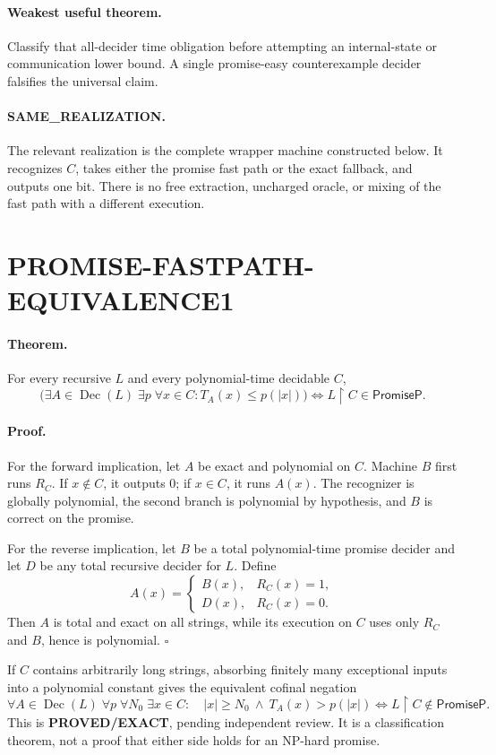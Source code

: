 \documentclass[11pt]{article}
\newcommand{\PromiseP}{\mathsf{PromiseP}}
\newcommand{\EXACT}{\textbf{PROVED/EXACT}}
\begin{document}
\paragraph{Weakest useful theorem.}
Classify that all-decider time obligation before attempting an internal-state
or communication lower bound.  A single promise-easy counterexample decider
falsifies the universal claim.

\paragraph{SAME\_REALIZATION.}
The relevant realization is the complete wrapper machine constructed below.
It recognizes $C$, takes either the promise fast path or the exact fallback,
and outputs one bit.  There is no free extraction, uncharged oracle, or mixing
of the fast path with a different execution.

\section{PROMISE-FASTPATH-EQUIVALENCE1}
\paragraph{Theorem.}
For every recursive $L$ and every polynomial-time decidable $C$,
\[
\boxed{
 \bigl(\exists A\in\operatorname{Dec}(L)\;\exists p\;
       \forall x\in C:T_A(x)\le p(|x|)\bigr)
 \iff L\upharpoonright C\in\PromiseP .}
\]

\paragraph{Proof.}
For the forward implication, let $A$ be exact and polynomial on $C$.
Machine $B$ first runs $R_C$.  If $x\notin C$, it outputs $0$; if
$x\in C$, it runs $A(x)$.  The recognizer is globally polynomial, the
second branch is polynomial by hypothesis, and $B$ is correct on the
promise.

For the reverse implication, let $B$ be a total polynomial-time promise
decider and let $D$ be any total recursive decider for $L$.  Define
\[
 A(x)=\begin{cases}
 B(x),&R_C(x)=1,\\
 D(x),&R_C(x)=0.
 \end{cases}
\]
Then $A$ is total and exact on all strings, while its execution on $C$
uses only $R_C$ and $B$, hence is polynomial. \hfill\(\square\)

If $C$ contains arbitrarily long strings, absorbing finitely many exceptional
inputs into a polynomial constant gives the equivalent cofinal negation
\[
 \forall A\in\operatorname{Dec}(L)\;\forall p\;\forall N_0\;
 \exists x\in C:\quad |x|\ge N_0\ \wedge\ T_A(x)>p(|x|)
 \iff L\upharpoonright C\notin\PromiseP .
\]
This is \EXACT, pending independent review.  It is a classification theorem,
not a proof that either side holds for an NP-hard promise.
\end{document}
